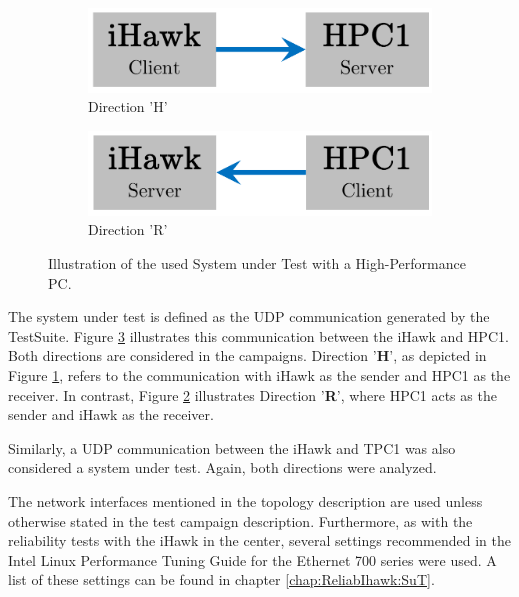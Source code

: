 \begin{figure}[h]
    \centering
    \begin{subfigure}[b]{0.45\textwidth}
        \centering
        \includegraphics[width=\textwidth]{figures/performance/sut_1a.pdf}
        \caption{Direction 'H'}
        \label{fig:SutHpcPerf:H}
    \end{subfigure}
    \hfill
    \begin{subfigure}[b]{0.45\textwidth}
        \centering
        \includegraphics[width=\textwidth]{figures/performance/sut_1b.pdf}
        \caption{Direction 'R'}
        \label{fig:SutHpcPerf:R}
    \end{subfigure}
    \caption{Illustration of the used System under Test with a High-Performance PC.}
    \label{fig:SutHpcPerf}
\end{figure}

The system under test is defined as the UDP communication generated by the TestSuite. Figure  \ref{fig:SutHpcPerf} illustrates this communication between the iHawk and HPC1. Both directions are considered in the campaigns. Direction '\textbf{H}', as depicted in Figure \ref{fig:SutHpcPerf:H}, refers to the communication with iHawk as the sender and HPC1 as the receiver. In contrast, Figure \ref{fig:SutHpcPerf:R} illustrates Direction '\textbf{R}', where HPC1 acts as the sender and iHawk as the receiver.

Similarly, a UDP communication between the iHawk and TPC1 was also considered a system under test. Again, both directions were analyzed.

The network interfaces mentioned in the topology description are used unless otherwise stated in the test campaign description. Furthermore, as with the reliability tests with the iHawk in the center, several settings recommended in the Intel Linux Performance Tuning Guide for the Ethernet 700 series were used. A list of these settings can be found in chapter \ref{chap:ReliabIhawk:SuT}.

